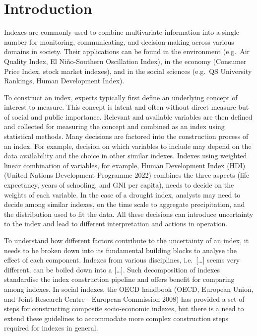 \documentclass[
]{interact}
\begin{document}
\hypertarget{introduction}{%
\section{Introduction}\label{introduction}}

Indexes are commonly used to combine multivariate information into a
single number for monitoring, communicating, and decision-making across
various domains in society. Their applications can be found in the
environment (e.g.~Air Quality Index, El Niño-Southern Oscillation
Index), in the economy (Consumer Price Index, stock market indexes), and
in the social sciences (e.g.~QS University Rankings, Human Development
Index).

To construct an index, experts typically first define an underlying
concept of interest to measure. This concept is latent and often without
direct measure but of social and public importance. Relevant and
available variables are then defined and collected for measuring the
concept and combined as an index using statistical methods. Many
decisions are factored into the construction process of an index. For
example, decision on which variables to include may depend on the data
availability and the choice in other similar indexes. Indexes using
weighted linear combination of variables, for example, Human Development
Index (HDI) (United Nations Development Programme 2022) combines the
three aspects (life expectancy, years of schooling, and GNI per capita),
needs to decide on the weights of each variable. In the case of a
drought index, analysts may need to decide among similar indexes, on the
time scale to aggregate precipitation, and the distribution used to fit
the data. All these decisions can introduce uncertainty to the index and
lead to different interpretation and actions in operation.

To understand how different factors contribute to the uncertainty of an
index, it needs to be broken down into its fundamental building blocks
to analyse the effect of each component. Indexes from various
disciplines, i.e.~{[}\ldots{]} seems very different, can be boiled down
into a {[}\ldots{]}. Such decomposition of indexes standardise the index
construction pipeline and offers benefit for comparing among indexes. In
social indexes, the OECD handbook (OECD, European Union, and Joint
Research Centre - European Commission 2008) has provided a set of steps
for constructing composite socio-economic indexes, but there is a need
to extend these guidelines to accommodate more complex construction
steps required for indexes in general.
\end{document}
